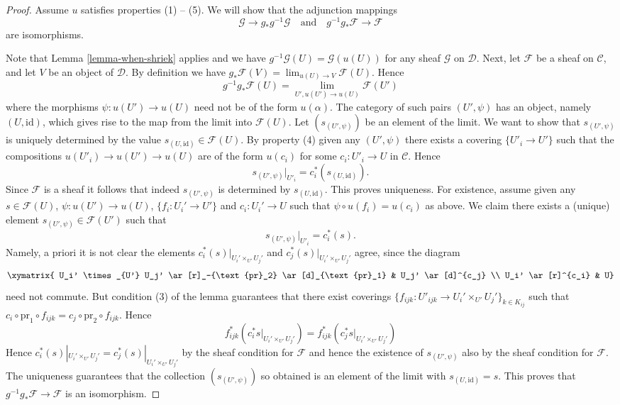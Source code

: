 \begin{proof}
Assume $u$ satisfies properties (1) -- (5). We will show that
the adjunction mappings
$$
\mathcal{G} \longrightarrow g_*g^{-1}\mathcal{G}
\quad\text{and}\quad
g^{-1}g_*\mathcal{F} \longrightarrow \mathcal{F}
$$
are isomorphisms.

\medskip\noindent
Note that Lemma \ref{lemma-when-shriek} applies and we have
$g^{-1}\mathcal{G}(U) = \mathcal{G}(u(U))$ for any sheaf $\mathcal{G}$
on $\mathcal{D}$. Next, let $\mathcal{F}$ be a sheaf on $\mathcal{C}$,
and let $V$ be an object of $\mathcal{D}$. By definition we have
$g_*\mathcal{F}(V) = \lim_{u(U) \to V} \mathcal{F}(U)$.
Hence
$$
g^{-1}g_*\mathcal{F}(U) = \lim_{U', u(U') \to u(U)} \mathcal{F}(U')
$$
where the morphisms $\psi : u(U') \to u(U)$ need not be of the form
$u(\alpha)$. The category of such pairs $(U', \psi)$ has an
object, namely $(U, \text{id})$, which gives rise to the map from
the limit into $\mathcal{F}(U)$. Let $(s_{(U', \psi)})$ be an element
of the limit. We want to show that $s_{(U', \psi)}$ is uniquely determined
by the value $s_{(U, \text{id})} \in \mathcal{F}(U)$. By property (4) given
any $(U', \psi)$ there exists a covering $\{U'_i \to U'\}$ such that the
compositions $u(U'_i) \to u(U') \to u(U)$ are of the form $u(c_i)$
for some $c_i : U'_i \to U$ in $\mathcal{C}$. Hence
$$
s_{(U', \psi)}|_{U'_i} = c_i^*(s_{(U, \text{id})}).
$$
Since $\mathcal{F}$ is a sheaf it follows that indeed $s_{(U', \psi)}$
is determined by $s_{(U, \text{id})}$. This proves uniqueness.
For existence, assume given any
$s \in \mathcal{F}(U)$, $\psi : u(U') \to u(U)$, $\{f_i : U_i' \to U'\}$
and $c_i : U_i' \to U$ such that $\psi \circ u(f_i) = u(c_i)$ as above.
We claim there exists a (unique) element
$s_{(U', \psi)} \in \mathcal{F}(U')$ such that
$$
s_{(U', \psi)}|_{U'_i} = c_i^*(s).
$$
Namely, a priori it is not clear the elements
$c_i^*(s)|_{U_i' \times_{U'} U_j'}$
and $c_j^*(s)|_{U_i' \times_{U'} U_j'}$ agree, since
the diagram
$$
\xymatrix{
U_i' \times_{U'} U_j' \ar[r]_-{\text{pr}_2} \ar[d]_{\text{pr}_1} &
U_j' \ar[d]^{c_j} \\
U_i' \ar[r]^{c_i} & U}
$$
need not commute. But condition (3) of the lemma guarantees that there
exist coverings
$\{f_{ijk} : U'_{ijk} \to U_i' \times_{U'} U_j'\}_{k \in K_{ij}}$ such that
$c_i \circ \text{pr}_1 \circ f_{ijk} = c_j \circ \text{pr}_2 \circ f_{ijk}$.
Hence
$$
f_{ijk}^* \left(c_i^*s|_{U_i' \times_{U'} U_j'}\right)
=
f_{ijk}^* \left(c_j^*s|_{U_i' \times_{U'} U_j'}\right)
$$
Hence $c_i^*(s)|_{U_i' \times_{U'} U_j'} = c_j^*(s)|_{U_i' \times_{U'} U_j'}$
by the sheaf condition for $\mathcal{F}$ and hence the existence of
$s_{(U', \psi)}$ also by the sheaf condition for $\mathcal{F}$. The uniqueness
guarantees that the collection $(s_{(U', \psi)})$ so obtained is an element
of the limit with $s_{(U, \text{id})} = s$. This proves
that $g^{-1}g_*\mathcal{F} \to \mathcal{F}$ is an isomorphism.


\end{proof}
